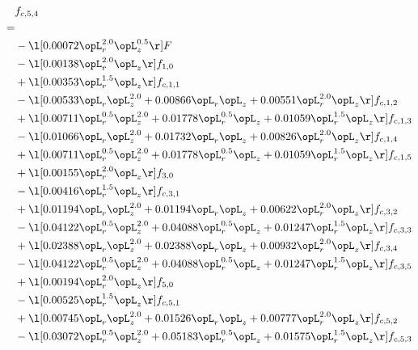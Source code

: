 \begin{alignat}{2} 
\label{eq:f_54_1} 
& f_{c,5,4} \nonumber \\ 
 = \\ 
& - \l[  0.00072 \opL_r^{2.0} \opL_z^{0.5}  \r] F \nonumber \\ 
& - \l[  0.00138 \opL_r^{2.0} \opL_z  \r] f_{1,0} \nonumber \\ 
& + \l[  0.00353 \opL_r^{1.5} \opL_z  \r] f_{c,1,1} \nonumber \\ 
& - \l[  0.00533 \opL_r \opL_z^{2.0} +  0.00866 \opL_r \opL_z +  0.00551 \opL_r^{2.0} \opL_z  \r] f_{c,1,2} \nonumber \\ 
& + \l[  0.00711 \opL_r^{0.5} \opL_z^{2.0} +  0.01778 \opL_r^{0.5} \opL_z +  0.01059 \opL_r^{1.5} \opL_z  \r] f_{c,1,3} \nonumber \\ 
& - \l[  0.01066 \opL_r \opL_z^{2.0} +  0.01732 \opL_r \opL_z +  0.00826 \opL_r^{2.0} \opL_z  \r] f_{c,1,4} \nonumber \\ 
& + \l[  0.00711 \opL_r^{0.5} \opL_z^{2.0} +  0.01778 \opL_r^{0.5} \opL_z +  0.01059 \opL_r^{1.5} \opL_z  \r] f_{c,1,5} \nonumber \\ 
& + \l[  0.00155 \opL_r^{2.0} \opL_z  \r] f_{3,0} \nonumber \\ 
& - \l[  0.00416 \opL_r^{1.5} \opL_z  \r] f_{c,3,1} \nonumber \\ 
& + \l[  0.01194 \opL_r \opL_z^{2.0} +  0.01194 \opL_r \opL_z +  0.00622 \opL_r^{2.0} \opL_z  \r] f_{c,3,2} \nonumber \\ 
& - \l[  0.04122 \opL_r^{0.5} \opL_z^{2.0} +  0.04088 \opL_r^{0.5} \opL_z +  0.01247 \opL_r^{1.5} \opL_z  \r] f_{c,3,3} \nonumber \\ 
& + \l[  0.02388 \opL_r \opL_z^{2.0} +  0.02388 \opL_r \opL_z +  0.00932 \opL_r^{2.0} \opL_z  \r] f_{c,3,4} \nonumber \\ 
& - \l[  0.04122 \opL_r^{0.5} \opL_z^{2.0} +  0.04088 \opL_r^{0.5} \opL_z +  0.01247 \opL_r^{1.5} \opL_z  \r] f_{c,3,5} \nonumber \\ 
& + \l[  0.00194 \opL_r^{2.0} \opL_z  \r] f_{5,0} \nonumber \\ 
& - \l[  0.00525 \opL_r^{1.5} \opL_z  \r] f_{c,5,1} \nonumber \\ 
& + \l[  0.00745 \opL_r \opL_z^{2.0} +  0.01526 \opL_r \opL_z +  0.00777 \opL_r^{2.0} \opL_z  \r] f_{c,5,2} \nonumber \\ 
& - \l[  0.03072 \opL_r^{0.5} \opL_z^{2.0} +  0.05183 \opL_r^{0.5} \opL_z +  0.01575 \opL_r^{1.5} \opL_z  \r] f_{c,5,3} \nonumber \\ 

\end{alignat}
